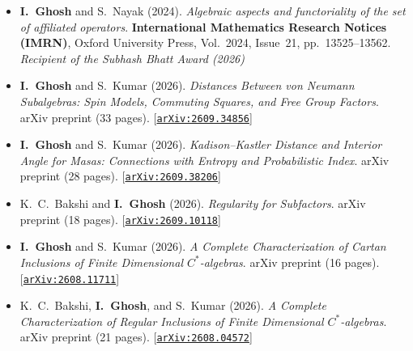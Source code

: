 \documentclass[10pt,a4paper]{article}
\begin{document}
\begin{itemize}[leftmargin=1.15em, itemsep=0.8pt, topsep=0.3pt]
  \item \textbf{I.~Ghosh} and S.~Nayak (2024). \textit{Algebraic aspects and functoriality of the set of affiliated operators}. \textbf{International Mathematics Research Notices (IMRN)}, Oxford University Press, Vol.~2024, Issue~21, pp.~13525--13562.  \enskip{\color{rulecolor}\textbar} \enskip{\color{rulecolor}\textbar}\enskip \textit{\small Recipient of the Subhash Bhatt Award (2026)}

  \item \textbf{I.~Ghosh} and S.~Kumar (2026). \textit{Distances Between von Neumann Subalgebras: Spin Models, Commuting Squares, and Free Group Factors}. arXiv preprint (33 pages). [\href{https://arxiv.org/abs/2609.34856}{\texttt{arXiv:2609.34856}}]

  \item \textbf{I.~Ghosh} and S.~Kumar (2026). \textit{Kadison--Kastler Distance and Interior Angle for Masas: Connections with Entropy and Probabilistic Index}. arXiv preprint (28 pages). [\href{https://arxiv.org/abs/2609.38206}{\texttt{arXiv:2609.38206}}]

  \item K.~C.~Bakshi and \textbf{I.~Ghosh} (2026). \textit{Regularity for Subfactors}. arXiv preprint (18 pages). [\href{https://arxiv.org/abs/2609.10118}{\texttt{arXiv:2609.10118}}]

  \item \textbf{I.~Ghosh} and S.~Kumar (2026). \textit{A Complete Characterization of Cartan Inclusions of Finite Dimensional $C^*$-algebras}. arXiv preprint (16 pages). [\href{https://arxiv.org/abs/2608.11711}{\texttt{arXiv:2608.11711}}]

  \item K.~C.~Bakshi, \textbf{I.~Ghosh}, and S.~Kumar (2026). \textit{A Complete Characterization of Regular Inclusions of Finite Dimensional $C^*$-algebras}. arXiv preprint (21 pages). [\href{https://arxiv.org/abs/2608.04572}{\texttt{arXiv:2608.04572}}]
\end{itemize}

\vspace{0.12em}
\end{document}
